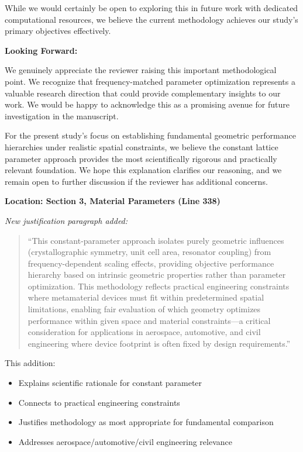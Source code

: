 \documentclass[11pt,a4paper]{article}
\newenvironment{responsebox}{%
    \par\medskip\noindent{\color{responsecolor}\rule{\linewidth}{2pt}}\par
    \noindent{\color{responsecolor}\bfseries Response}\par\smallskip
}{%
    \par\noindent{\color{responsecolor}\rule{\linewidth}{0.5pt}}\medskip
}
\newenvironment{changesbox}{%
    \par\medskip\noindent{\color{changescolor}\rule{\linewidth}{2pt}}\par
    \noindent{\color{changescolor}\bfseries Manuscript Changes}\par\smallskip
}{%
    \par\noindent{\color{changescolor}\rule{\linewidth}{0.5pt}}\medskip
}
\begin{document}
\begin{responsebox}
While we would certainly be open to exploring this in future work with dedicated computational resources, we believe the current methodology achieves our study's primary objectives effectively.

\textbf{Looking Forward:}

We genuinely appreciate the reviewer raising this important methodological point. We recognize that frequency-matched parameter optimization represents a valuable research direction that could provide complementary insights to our work. We would be happy to acknowledge this as a promising avenue for future investigation in the manuscript.

For the present study's focus on establishing fundamental geometric performance hierarchies under realistic spatial constraints, we believe the constant lattice parameter approach provides the most scientifically rigorous and practically relevant foundation. We hope this explanation clarifies our reasoning, and we remain open to further discussion if the reviewer has additional concerns.
\end{responsebox}

\begin{changesbox}
\textbf{Location: Section 3, Material Parameters (Line 338)}

\textit{New justification paragraph added:}
\begin{quote}
\textcolor{redtext}{``This constant-parameter approach isolates purely geometric influences (crystallographic symmetry, unit cell area, resonator coupling) from frequency-dependent scaling effects, providing objective performance hierarchy based on intrinsic geometric properties rather than parameter optimization. This methodology reflects practical engineering constraints where metamaterial devices must fit within predetermined spatial limitations, enabling fair evaluation of which geometry optimizes performance within given space and material constraints---a critical consideration for applications in aerospace, automotive, and civil engineering where device footprint is often fixed by design requirements.''}
\end{quote}

This addition:
\begin{itemize}
    \item Explains scientific rationale for constant parameter
    \item Connects to practical engineering constraints
    \item Justifies methodology as most appropriate for fundamental comparison
    \item Addresses aerospace/automotive/civil engineering relevance
\end{itemize}
\end{changesbox}
\end{document}

